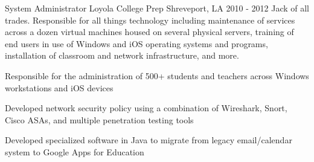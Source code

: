 \begin{cventries}
  \cventry
    {System Administrator} %
    {Loyola College Prep} %
    {Shreveport, LA} %
    {2010 - 2012} %
    {Jack of all trades.  Responsible for all things technology including maintenance of services across a dozen virtual machines housed on several physical servers, training of end users in use of Windows and iOS operating systems and programs, installation of classroom and network infrastructure, and more.} %
    {
      \begin{cvitems} %
        \item {Responsible for the administration of 500+ students and teachers across Windows workstations and iOS devices}
        \item {Developed network security policy using a combination of Wireshark, Snort, Cisco ASAs, and multiple penetration testing tools}
        \item {Developed specialized software in Java to migrate from legacy email/calendar system to Google Apps for Education}
      \end{cvitems}
    }

\end{cventries}

